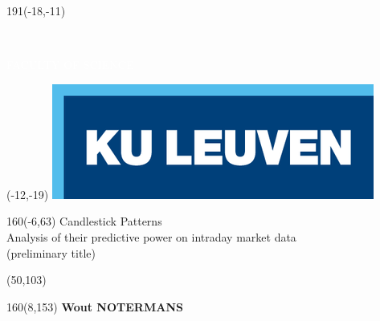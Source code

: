 \documentclass[
  12pt,
  a4paper,
  oneside]{book}
\author{}
\date{\vspace{-2.5em}}
\begin{document}
\thispagestyle{empty}
\newcommand{\form}[1]{\scalebox{1.087}{\boldmath{#1}}}
\sffamily
%
\begin{textblock}{191}(-18,-11)
\colorbox{bluetitle}{\hspace{139mm}\ \parbox[c][18truemm]{52mm}{\textcolor{white}{FACULTY OF SCIENCE}}}
\end{textblock}
%
\begin{textblock}{70}(-12,-19)
\textblockcolour{}
\includegraphics*[height=19.8truemm]{Images/LogoKULeuven}
\end{textblock}
%
\begin{textblock}{160}(-6,63)
\textblockcolour{}
\vspace{-\parskip}
\flushleft
\fontsize{40}{42}\selectfont \textcolor{bluetitle}{Candlestick Patterns}\\[1.5mm]
\fontsize{20}{22}\selectfont Analysis of their predictive power on intraday market data\\(preliminary title)
\end{textblock}
%
\begin{textblock}{82}(50,103)
\textblockcolour{}
\vspace{-\parskip}
\flushleft
\end{textblock}
%
\begin{textblock}{160}(8,153)
\textblockcolour{}
\vspace{-\parskip}
\flushright
\fontsize{14}{16}\selectfont \textbf{Wout NOTERMANS}
\end{textblock}
\end{document}
